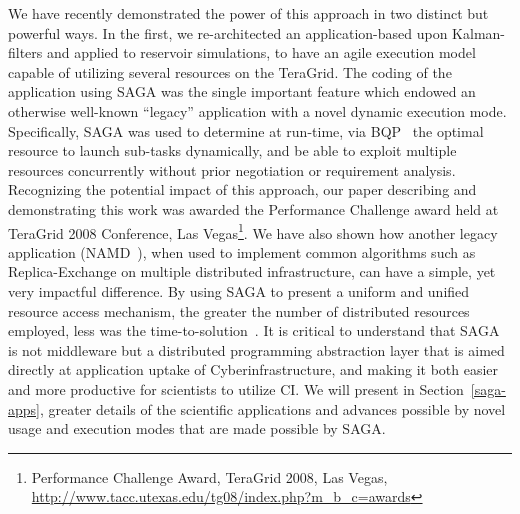 \documentclass[10pt,letterpaper]{article}
\begin{document}
We have recently demonstrated the power of this approach in two
distinct but powerful ways. In the first, we re-architected an
application-based upon Kalman-filters and applied to reservoir
simulations, to have an agile execution model capable of utilizing
several resources on the TeraGrid. The coding of the application
using SAGA was the single important feature which endowed an otherwise
well-known ``legacy'' application with a novel dynamic execution
mode. Specifically, SAGA was used to determine at run-time, via
BQP~\cite{bqp} the optimal resource to launch sub-tasks dynamically,
and be able to exploit multiple resources concurrently without prior
negotiation or requirement analysis. Recognizing the potential impact
of this approach, our paper describing and demonstrating this work was
awarded the Performance Challenge award held at TeraGrid 2008
Conference, Las Vegas\footnote{Performance Challenge Award, TeraGrid
  2008, Las Vegas,
  \url{http://www.tacc.utexas.edu/tg08/index.php?m_b_c=awards}}. We
have also shown how another legacy application (NAMD~\cite{NAMD}),
when used to implement common algorithms such as Replica-Exchange on
multiple distributed infrastructure, can have a simple, yet very
impactful difference. By using SAGA to present a uniform and unified
resource access mechanism, the greater the number of distributed
resources employed, less was the time-to-solution~\cite{saga_papers}. 
It is critical to understand that
SAGA is not middleware but a distributed programming abstraction layer
that is aimed directly at application uptake of Cyberinfrastructure,
and making it both easier and more productive for scientists to
utilize CI.  We will present in Section~\ref{saga-apps}, greater
details of the scientific applications and advances possible by novel
usage and execution modes that are made possible by SAGA.   

\end{document}
